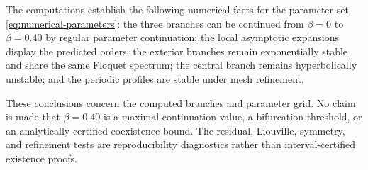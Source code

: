 The computations establish the following numerical facts for the
parameter set \eqref{eq:numerical-parameters}: the three branches can be
continued from $\beta=0$ to $\beta=0.40$ by regular parameter
continuation; the local asymptotic expansions display the predicted
orders; the exterior branches remain exponentially stable and share the
same Floquet spectrum; the central branch remains hyperbolically
unstable; and the periodic profiles are stable under mesh refinement.

These conclusions concern the computed branches and parameter grid. No
claim is made that $\beta=0.40$ is a maximal continuation value, a
bifurcation threshold, or an analytically certified coexistence bound.
The residual, Liouville, symmetry, and refinement tests are
reproducibility diagnostics rather than interval-certified existence
proofs.

\FloatBarrier
